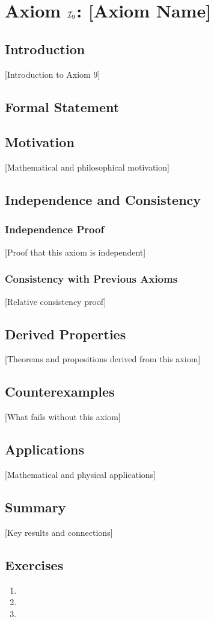 \chapter{Axiom $\mathcal{I}_9$: [Axiom Name]}
\label{ch:axiom-I9}

\section{Introduction}
[Introduction to Axiom 9]

\section{Formal Statement}
\begin{axiom}
\end{axiom}

\section{Motivation}
[Mathematical and philosophical motivation]

\section{Independence and Consistency}
\subsection{Independence Proof}
[Proof that this axiom is independent]

\subsection{Consistency with Previous Axioms}
[Relative consistency proof]

\section{Derived Properties}
[Theorems and propositions derived from this axiom]

\section{Counterexamples}
[What fails without this axiom]

\section{Applications}
[Mathematical and physical applications]

\section{Summary}
[Key results and connections]

\section{Exercises}
\begin{enumerate}
\item [Exercise 1]
\item [Exercise 2]
\item [Exercise 3]
\end{enumerate}
